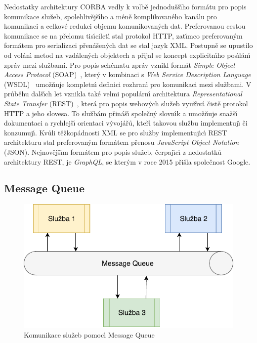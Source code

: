 Nedostatky architektury \gls{CORBA} vedly k volbě jednodušš\'{\i}ho
formátu pro popis komunikace služeb, spolehlivějš\'{\i}ho a méně
komplikovaného kanálu pro komunikaci a celkové redukci
objemu komunikovan\'ych dat. Preferovanou cestou komunikace
se na přelomu tis\'{\i}cilet\'{\i} stal protokol \gls{HTTP}, zat\'{\i}mco preferovan\'ym formátem
pro serializaci přenášen\'ych dat se stal jazyk \gls{XML}.
Postupně se upustilo od volán\'{\i} metod na vzdálen\'ych objektech a přijal
se koncept explicitn\'{\i}ho pos\'{\i}lán\'{\i} zpráv mezi službami.
Pro popis schématu zpráv vznikl formát \textit{Simple Object Access
Protocol} (\gls{SOAP})~\cite{box2000simple}, kter\'y v kombinaci s
\textit{Web Service Description Language} (\gls{WSDL})~\cite{christensen2001web}
umožňuje kompletn\'{\i} definici rozhran\'{\i} pro komunikaci mezi službami.
V průběhu dalš\'{\i}ch let vznikla také velmi populárn\'{\i} architektura
\textit{Representational State Transfer} (\gls{REST})~\cite{fielding2000rest},
která pro popis webov\'ych služeb využ\'{\i}vá čistě protokol \gls{HTTP} a jeho slovesa.
To službám přináš\'{\i} společn\'y slovn\'{\i}k a umožňuje snažš\'{\i} dokumentaci
a rychlejš\'{\i} orientaci v\'yvojářů, kteř\'{\i} takovou službu implementuj\'{\i} či konzumuj\'{\i}.
Kvůli těžkopádnosti \gls{XML} se pro služby implementuj\'{\i}c\'{\i} \gls{REST} architekturu stal
preferovan\'ym formátem přenosu \textit{JavaScript Object Notation} (\gls{JSON}).
Nejnovějš\'{\i}m formátem pro popis služeb, čerpaj\'{\i}c\'{\i} z nedostatků architektury \gls{REST}, je
\textit{GraphQL}, se kter\'ym v roce 2015 přišla společnost Google.

\subsection{Message Queue}

\begin{figure}
    \centering
    \includegraphics[keepaspectratio=true, width=0.5\linewidth]{figures/message-queue.pdf}
    \caption{Komunikace služeb pomoc\'{\i} Message Queue}
    \label{fig:message-queue}
\end{figure}

